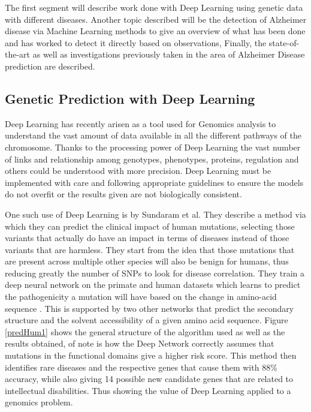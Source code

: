 The first segment will describe work done with Deep Learning using genetic data with different diseases. Another topic described will be the detection of Alzheimer disease via Machine Learning methods to give an overview of what has been done and has worked to detect it directly based on observations, Finally, the state-of-the-art as well as investigations previously taken in the area of Alzheimer Disease prediction are described.
 
\subsection{Genetic Prediction with Deep Learning}

Deep Learning has recently arisen as a tool used for Genomics analysis to understand the vast amount of data available in all the different pathways of the chromosome. Thanks to the processing power of Deep Learning the vast number of links and relationship among genotypes, phenotypes, proteins, regulation and others could be understood with more precision. Deep Learning must be implemented with care and following appropriate guidelines to ensure the models do not overfit or the results given are not biologically consistent.\cite{Zou2019}

One such use of Deep Learning is by Sundaram et al\cite{Sundaram2018}. They describe a method via which they can predict the clinical impact of human mutations, selecting those variants that actually do have an impact in terms of diseases instead of those variants that are harmless. They start from the idea that those mutations that are present across multiple other species will also be benign for humans, thus reducing greatly the number of SNPs to look for disease correlation. They train a deep neural network on the primate and human datasets which learns to predict the pathogenicity a mutation will have based on the change in amino-acid sequence . This is supported by two other networks that predict the secondary structure and the solvent accessibility of a given amino acid sequence. Figure \ref{predHum1} shows the general structure of the algorithm used as well as the results obtained, of note is how the Deep Network correctly assumes that mutations in the functional domains give a higher risk score. This method then identifies rare diseases and the respective genes that cause them with 88\% accuracy, while also giving 14 possible new candidate genes that are related to intellectual disabilities. Thus showing the value of Deep Learning applied to a genomics problem.

